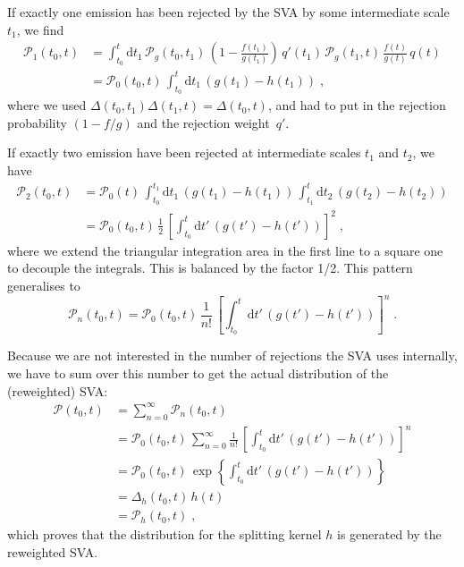 \documentclass[a4paper]{scrartcl}
\newcommand{\tvar}{\ensuremath{t}\xspace}
\newcommand{\diff}{\ensuremath{\text{d}}\xspace}
\begin{document}
If exactly one emission has been rejected by the SVA by some intermediate scale
$\tvar_1$, we find
\begin{align}
    \mathcal{P}_1(\tvar_0, \tvar) &=
    \int_{\tvar_0}^{\tvar}\diff\tvar_1 \,
    \mathcal{P}_g(\tvar_0, \tvar_1) \,
    \left(1-\frac{f(\tvar_1)}{g(\tvar_1)}\right) \,
    q'(\tvar_1) \,
    \mathcal{P}_g(\tvar_1, \tvar) \,
    \frac{f(\tvar)}{g(\tvar)} \, q(\tvar) \\
    &=
    \mathcal{P}_0(\tvar_0, \tvar) \,
    \int_{\tvar_0}^{\tvar}\diff\tvar_1 \,
    \left(g(\tvar_1) - h(\tvar_1)\right)\;,
\end{align}
where we used
$\Delta(\tvar_0, \tvar_1)\Delta(\tvar_1,\tvar)=\Delta(\tvar_0,\tvar)$,
and had to put in the rejection probability $(1-f/g)$ and the rejection
weight~$q'$.

If exactly two emission have been rejected at intermediate scales $\tvar_1$ and
$\tvar_2$, we have
\begin{align}
    \mathcal{P}_2(\tvar_0, \tvar) &=
    \mathcal{P}_0(\tvar)\,
    \int_{\tvar_0}^{\tvar_1} \diff \tvar_1 \,
    \left(g(\tvar_1) - h(\tvar_1)\right)\,
    \int_{\tvar_1}^{\tvar} \diff \tvar_2 \,
    \left(g(\tvar_2) - h(\tvar_2)\right) \\
    &=
    \mathcal{P}_0(\tvar_0, \tvar) \,
    \frac{1}{2} \,
    \left[ \int_{\tvar_0}^{\tvar}\diff\tvar' \,
    \left(g(\tvar') - h(\tvar')\right)
    \right]^2\;,
\end{align}
where we extend the triangular integration area in the first line to a square
one to decouple the integrals. This is balanced by the factor 1/2.  This
pattern generalises to
\begin{equation}
    \mathcal{P}_n(\tvar_0, \tvar) =
    \mathcal{P}_0(\tvar_0, \tvar)\,
    \frac{1}{n!}\,
    \left[ \int_{\tvar_0}^{\tvar}\diff\tvar' \,
    \left(g(\tvar') - h(\tvar')\right)
    \right]^n\;.
\end{equation}

Because we are not interested in the number of rejections the SVA uses
internally, we have to sum over this number to get the actual distribution of
the (reweighted) SVA:
\begin{align}
    \mathcal{P}(\tvar_0, \tvar) &=
    \sum_{n=0}^\infty \mathcal{P}_n(\tvar_0, \tvar) \\
    &=
    \mathcal{P}_0(\tvar_0, \tvar)\,
    \sum_{n=0}^\infty
    \frac{1}{n!}\,
    \left[ \int_{\tvar_0}^{\tvar}\diff\tvar' \,
    \left(g(\tvar') - h(\tvar')\right)
    \right]^n \\
    &=
    \mathcal{P}_0(\tvar_0, \tvar)\,
    \exp\left\{
    \int_{\tvar_0}^{\tvar}\diff\tvar' \,
    \left(g(\tvar') - h(\tvar')\right)
    \right\} \\
    &=
    \Delta_h(\tvar_0, \tvar) \, h(\tvar) \\
    &=
    \mathcal{P}_h(\tvar_0, \tvar)\;,
\end{align}
which proves that the distribution for the splitting kernel $h$ is generated by
the reweighted SVA.
\end{document}
